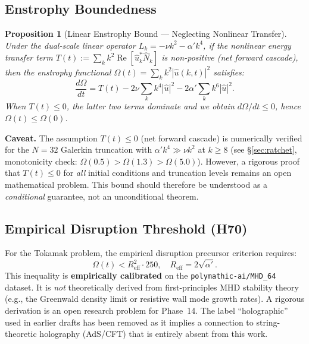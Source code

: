 \documentclass[10pt,twocolumn]{article}
\newtheorem{proposition}[theorem]{Proposition}
\begin{document}
\subsection{Enstrophy Boundedness}

\begin{proposition}[Linear Enstrophy Bound --- Neglecting Nonlinear Transfer]
\label{prop:enstrophy}
Under the dual-scale linear operator $L_k = -\nu k^2 - \alpha' k^4$,
if the nonlinear energy transfer term
$T(t) := \sum_k k^2 \operatorname{Re}[\hat{u}_k^* \hat{N}_k]$ is
non-positive (net forward cascade), then the enstrophy functional
$\Omega(t) = \sum_k k^2 |\hat{u}(k,t)|^2$ satisfies:
\begin{equation}
  \frac{d\Omega}{dt} = T(t) - 2\nu \sum_k k^4 |\hat{u}|^2
  - 2\alpha' \sum_k k^6 |\hat{u}|^2.
\end{equation}
When $T(t) \le 0$, the latter two terms dominate and we obtain
$d\Omega/dt \le 0$, hence $\Omega(t) \le \Omega(0)$.
\end{proposition}

\noindent\textbf{Caveat.} The assumption $T(t) \le 0$ (net forward cascade)
is numerically verified for the $N{=}32$ Galerkin truncation with
$\alpha' k^4 \gg \nu k^2$ at $k \ge 8$ (see \S\ref{sec:ratchet},
monotonicity check: $\Omega(0.5) > \Omega(1.3) > \Omega(5.0)$).
However, a rigorous proof that $T(t) \le 0$ for \emph{all} initial
conditions and truncation levels remains an open mathematical problem.
This bound should therefore be understood as a \emph{conditional}
guarantee, not an unconditional theorem.

\subsection{Empirical Disruption Threshold (H70)}

For the Tokamak problem, the empirical disruption precursor criterion requires:
\begin{equation}
  \Omega(t) < R_{\mathrm{eff}}^2 \cdot 250,
  \quad R_{\mathrm{eff}} = 2\sqrt{\alpha'}.
\end{equation}
This inequality is \textbf{empirically calibrated} on the \texttt{polymathic-ai/MHD\_64}
dataset. It is \emph{not} theoretically derived from first-principles MHD stability
theory (e.g., the Greenwald density limit or resistive wall mode growth rates).
A rigorous derivation is an open research problem for Phase~14.
The label ``holographic'' used in earlier drafts has been removed as it
implies a connection to string-theoretic holography (AdS/CFT) that is
entirely absent from this work.
\end{document}
